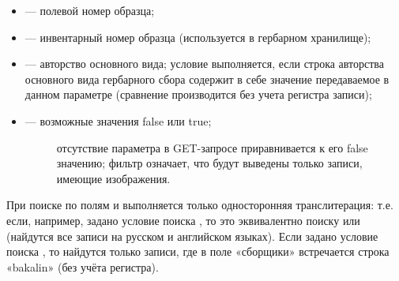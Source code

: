 \documentclass[letterpaper,10pt,russian]{sphinxmanual}
\begin{document}
\begin{itemize}
\item {} 
 — полевой номер образца;

\item {} 
 — инвентарный номер образца (используется в гербарном хранилище);

\item {} 
 — авторство основного вида; условие выполняется, если строка авторства основного вида гербарного сбора содержит в себе значение передаваемое в данном параметре (сравнение производится без учета регистра записи);

\item {} \begin{description}
\item[{ — возможные значения false или true;}] \leavevmode
отсутствие параметра в GET-запросе приравнивается к его false значению;
фильтр  означает, что будут выведены только записи, имеющие изображения.

\end{description}

\end{itemize}

 При поиске по полям  и  выполняется только односторонняя транслитерация: т.е. если, например, задано условие поиска , то это эквивалентно поиску  или
 (найдутся все записи на русском и английском языках). Если задано условие поиска , то найдутся только записи, где в поле «сборщики» встречается строка «bakalin» (без учёта регистра).

\ignorespaces 
\end{document}
